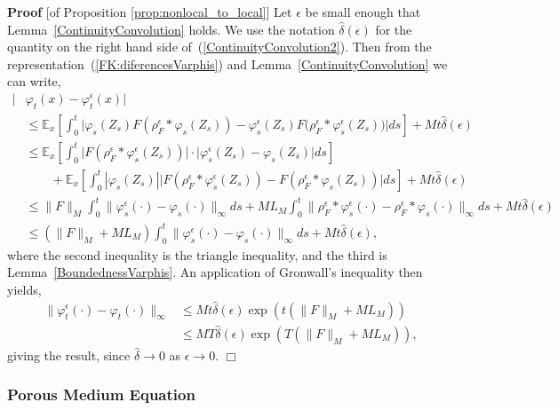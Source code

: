 \documentclass[12pt]{article}
\newenvironment {proof}{{\noindent\bf Proof }}{\hfill $\Box$ \medskip}
\newcommand{\IE}{\mathbb E}
\numberwithin{equation}{section}
\begin{document}
\begin{proof}[of Proposition \ref{prop:nonlocal_to_local}]
Let $\epsilon$ be small enough that Lemma~\ref{ContinuityConvolution} holds. 
We use the notation $\widehat{\delta}(\epsilon)$ for the quantity on the right hand side 
of~(\ref{ContinuityConvolution2}).
Then from the representation~(\ref{FK:diferencesVarphis}) 
and Lemma~\ref{ContinuityConvolution} we can write,
\begin{align*}
| &\varphi_t(x) - \varphi^\epsilon_t(x)|  \\ 
& \leq \IE_x\left[ \int_0^t\Big| \varphi_s(Z_s)
F(\rho^\epsilon_F*\varphi_s(Z_s))
-\varphi^\epsilon_s(Z_s)
F\big(\rho^\epsilon_F*\varphi^\epsilon_s(Z_s)\big)\Big| ds \right] 
+M t \widehat{\delta}(\epsilon)   \\ 
& \leq \IE_x\left[ \int_0^t \big|F(\rho^\epsilon_F*\varphi^\epsilon_s(Z_s))\big|\cdot
\big|\varphi^\epsilon_s(Z_s)-\varphi_s(Z_s)\big| ds  \right] \\ 
& \qquad +  \IE_x\left[\int_0^t |\varphi_s(Z_s)| 
\big|F(\rho^\epsilon_F*\varphi^\epsilon_s(Z_s))
-F(\rho^\epsilon_F*\varphi_s(Z_s))\big| ds \right] 
+ M t \widehat{\delta}(\epsilon)  \\ 
& \leq \| F \|_M \int_0^t \| \varphi^\epsilon_s(\cdot) 
- \varphi_s(\cdot) \|_\infty ds
  + M L_M \int_0^t \| \rho^\epsilon_F*\varphi^\epsilon_s(\cdot)
-\rho^\epsilon_F*\varphi_s(\cdot) \|_\infty ds 
+  M  t \widehat{\delta}(\epsilon)  \\ 
& \leq (\| F \|_M + M L_M) 
\int_0^t \| \varphi^\epsilon_s(\cdot) - \varphi_s(\cdot) \|_\infty ds 
+ M  t \widehat{\delta}(\epsilon),
\end{align*}
where the second inequality is the triangle inequality, 
and the third is Lemma~\ref{BoundednessVarphis}. 
An application of Gronwall's inequality then yields,
\begin{align*}
\| \varphi^\epsilon_t(\cdot)-\varphi_t(\cdot)\|_\infty 
&\leq M  t \widehat{\delta}(\epsilon)  
\exp(t (\| F \|_M + M L_M)) \\ 
& \leq  M  T \widehat{\delta}(\epsilon)  \exp(T(\| F \|_M + M L_M)),
\end{align*}
	giving the result, since $\widehat{\delta}\to 0$ as $\epsilon\to 0$.
\end{proof}


\subsubsection{Porous Medium Equation}
\end{document}
